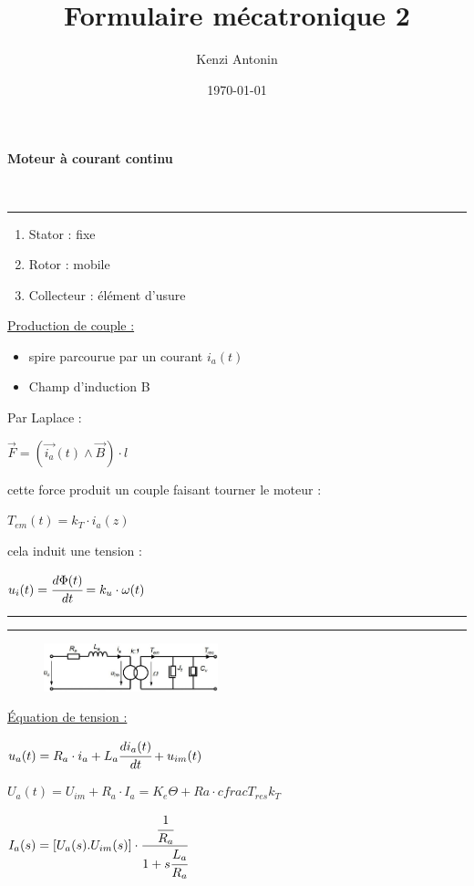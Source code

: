\documentclass[	DIV=calc,%
							paper=a4,%
							fontsize=10pt,%
							twocolumn]{scrartcl} %
\title{Formulaire mécatronique 2} %
\author{Kenzi Antonin}	%
\date{\vspace{-30pt} \today} %
\newcommand{\hformbar}[1]{\bigskip \hrule \vspace{1pt} \hrule \vspace{5pt}} %
\newcommand{\initial}[1]{%
     \lettrine[lines=3,lhang=0.3,nindent=0em]{
     				\color{DarkGoldenrod}
     				{\textsf{#1}}}{}}
\newcounter{mycounter}
\newcommand{\formdesc}[1]{\large\textbf{#1} \addtocounter{mycounter}{1} \hfill \themycounter \\ \vspace{-3mm} \hrule \vspace{2mm}}
\newcommand{\formtitle}[1]{\large\underline{#1}}
\begin{document}
\maketitle
\thispagestyle{fancy} 	%

\formdesc{Moteur à courant continu}
\begin{enumerate}
    \item Stator : fixe
    \item Rotor : mobile
    \item Collecteur : élément d'usure 
\end{enumerate}

\formtitle{Production de couple :}
\begin{itemize}
    \item spire parcourue par un courant $i_a(t)$
    \item Champ d'induction B 
\end{itemize}
Par Laplace :

{\hfill $\vec{F} = (\vec{i_a}(t) \wedge  \vec{B})\cdot l$\hfill}

cette force produit un couple faisant tourner le moteur : 

{\hfill $T_{em}(t) = k_T \cdot i_a(z)$\hfill}

cela induit une tension :

{\hfill $u_i(t) = \cfrac{d \Phi(t)}{dt}=k_u \cdot \omega(t)$\hfill}

\hformbar

\formdesc{Équations du moteur Dc et de la charge}

{ \vspace{-3mm}
    \begin{figure}[H]
        \includegraphics[width=0.45\textwidth]{img/equation_mot.JPG}
    \end{figure}
}
\formtitle{Équation de tension : }

{\hfill $u_a(t) = R_a \cdot i_a + L_a \cfrac{di_a(t)}{dt}+u_{im}(t)$\hfill}


{\hfill $U_a(t) = U_{im} + R_a \cdot I_a = K_e \Theta + Ra \cdot cfrac{T_{res}}{k_T} $\hfill}

{\hfill $I_a(s) = [U_a(s).U_{im}(s)] \cdot \cfrac{ \cfrac{1}{R_a}}{1+s\cfrac{L_a}{R_a}}  $\hfill}
\end{document}
